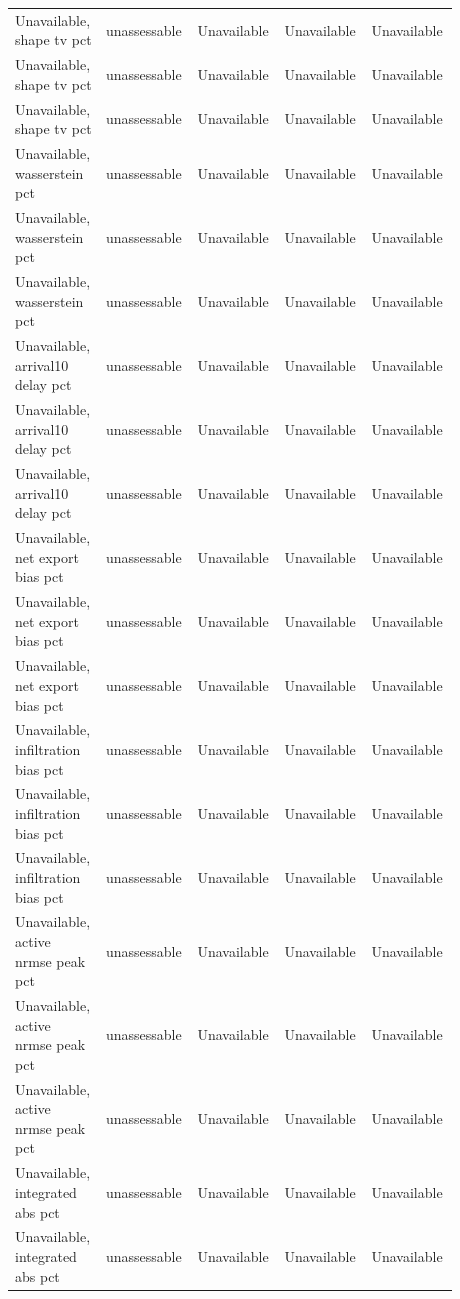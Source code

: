 \begin{longtable}{p{0.1760\linewidth}p{0.1760\linewidth}p{0.1760\linewidth}p{0.1760\linewidth}p{0.1760\linewidth}}
Unavailable, shape tv pct & unassessable & Unavailable & Unavailable & Unavailable \\
Unavailable, shape tv pct & unassessable & Unavailable & Unavailable & Unavailable \\
Unavailable, shape tv pct & unassessable & Unavailable & Unavailable & Unavailable \\
Unavailable, wasserstein pct & unassessable & Unavailable & Unavailable & Unavailable \\
Unavailable, wasserstein pct & unassessable & Unavailable & Unavailable & Unavailable \\
Unavailable, wasserstein pct & unassessable & Unavailable & Unavailable & Unavailable \\
Unavailable, arrival10 delay pct & unassessable & Unavailable & Unavailable & Unavailable \\
Unavailable, arrival10 delay pct & unassessable & Unavailable & Unavailable & Unavailable \\
Unavailable, arrival10 delay pct & unassessable & Unavailable & Unavailable & Unavailable \\
Unavailable, net export bias pct & unassessable & Unavailable & Unavailable & Unavailable \\
Unavailable, net export bias pct & unassessable & Unavailable & Unavailable & Unavailable \\
Unavailable, net export bias pct & unassessable & Unavailable & Unavailable & Unavailable \\
Unavailable, infiltration bias pct & unassessable & Unavailable & Unavailable & Unavailable \\
Unavailable, infiltration bias pct & unassessable & Unavailable & Unavailable & Unavailable \\
Unavailable, infiltration bias pct & unassessable & Unavailable & Unavailable & Unavailable \\
Unavailable, active nrmse peak pct & unassessable & Unavailable & Unavailable & Unavailable \\
Unavailable, active nrmse peak pct & unassessable & Unavailable & Unavailable & Unavailable \\
Unavailable, active nrmse peak pct & unassessable & Unavailable & Unavailable & Unavailable \\
Unavailable, integrated abs pct & unassessable & Unavailable & Unavailable & Unavailable \\
Unavailable, integrated abs pct & unassessable & Unavailable & Unavailable & Unavailable \\

\end{longtable}
